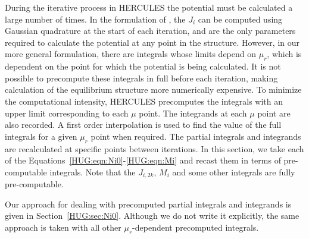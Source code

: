 \documentclass[11pt, oneside]{article}   	%
\begin{document}
During the iterative process in HERCULES the potential must be calculated a large number of times. 
In the formulation of \cite{Hubbard2013}, the $J_i$ can be computed using Gaussian quadrature at the start of each iteration, and are the only parameters required to calculate the potential at any point in the structure.
However, in our more general formulation, there are integrals whose limits depend on $\mu_r$, which is dependent on the point for which the potential is being calculated.
It is not possible to precompute these integrals in full before each iteration, making calculation of the equilibrium structure more numerically expensive.
To minimize the computational intensity, HERCULES precomputes the integrals with an upper limit corresponding to each $\mu$ point. The integrands at each $\mu$ point are also recorded. A first order interpolation is used to find the value of the full integrals for a given $\mu_r$ point when required. The partial integrals and integrands are recalculated at specific points between iterations.  
In this section, we take each of the Equations~\ref{HUG:eqn:Ni0}-\ref{HUG:eqn:Mi} and recast them in terms of pre-computable integrals.
Note that the $J_{i,2k}$, $M_i$ and some other integrals are fully pre-computable. 

\vspace{0.5cm}
\begin{tcolorbox}[colback=white, colframe=SchoolColor, title=Note]
Our approach for dealing with precomputed partial integrals and integrands is given in Section~\ref{HUG:sec:Ni0}.
Although we do not write it explicitly, the same approach is taken with all other $\mu_r$-dependent precomputed integrals.
\end{tcolorbox}

\end{document}
